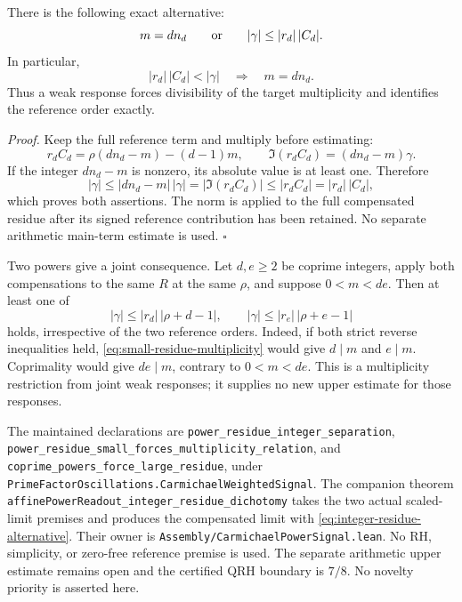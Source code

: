 There is the following exact alternative:
\begin{equation}\label{eq:integer-residue-alternative}
 m=d n_d
 \qquad\hbox{or}\qquad
 |\gamma|\le |r_d|\,|C_d|.
\end{equation}
In particular,
\begin{equation}\label{eq:small-residue-multiplicity}
 |r_d|\,|C_d|<|\gamma|
 \quad\Longrightarrow\quad m=d n_d.
\end{equation}
Thus a weak response forces divisibility of the target multiplicity
and identifies the reference order exactly.

\emph{Proof.}
Keep the full reference term and multiply before estimating:
\[
 r_d C_d=\rho(d n_d-m)-(d-1)m,\qquad
 \Im(r_d C_d)=(d n_d-m)\gamma.
\]
If the integer \(d n_d-m\) is nonzero, its absolute value is at least
one. Therefore
\[
 |\gamma|\le |d n_d-m|\,|\gamma|
 =|\Im(r_d C_d)|\le |r_d C_d|=|r_d|\,|C_d|,
\]
which proves both assertions. The norm is applied to the full
compensated residue after its signed reference contribution has been
retained. No separate arithmetic main-term estimate is used.
\(\square\)

Two powers give a joint consequence. Let \(d,e\ge2\) be coprime
integers, apply both compensations to the same \(R\) at the same \(\rho\),
and suppose \(0<m<de\). Then at least one of
\begin{equation}\label{eq:coprime-power-response}
 |\gamma|\le |r_d|\,|\rho+d-1|,
 \qquad
 |\gamma|\le |r_e|\,|\rho+e-1|
\end{equation}
holds, irrespective of the two reference orders.
Indeed, if both strict reverse inequalities held,
\eqref{eq:small-residue-multiplicity} would give \(d\mid m\) and
\(e\mid m\). Coprimality would give \(de\mid m\), contrary to
\(0<m<de\). This is a multiplicity restriction from joint weak responses;
it supplies no new upper estimate for those responses.

The maintained declarations are
\texttt{power\_residue\_integer\_separation},
\texttt{power\_residue\_small\_forces\_multiplicity\_relation}, and
\texttt{coprime\_powers\_force\_large\_residue}, under
\texttt{PrimeFactorOscillations.CarmichaelWeightedSignal}.
The companion theorem
\texttt{affinePowerReadout\_integer\_residue\_dichotomy}
takes the two actual scaled-limit premises and produces the compensated
limit with \eqref{eq:integer-residue-alternative}. Their owner is
\texttt{Assembly/CarmichaelPowerSignal.lean}.
No RH, simplicity, or zero-free reference premise is used.
The separate arithmetic upper estimate remains open and the certified
QRH boundary is \(7/8\). No novelty priority is asserted here.

